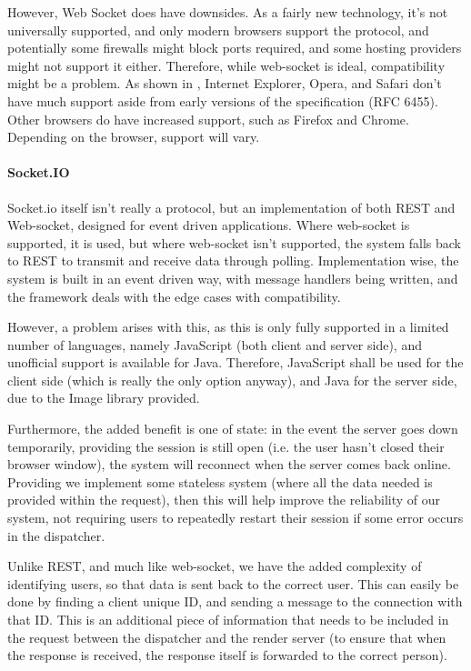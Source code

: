 \documentclass[10pt,a4paper]{article}
\begin{document}
However, Web Socket does have downsides. As a fairly new technology, it's not universally supported, and only modern browsers
support the protocol, and potentially some firewalls might block ports required, and some hosting providers might not support 
it either. Therefore, while web-socket is ideal, compatibility might be a problem. As shown in \cite{WebSocketDeveloper},
Internet Explorer, Opera, and Safari don't have much support aside from early versions of the specification (RFC 6455). Other browsers
do have increased support, such as Firefox and Chrome. Depending on the browser, support will vary.

\paragraph{Socket.IO}
Socket.io itself isn't really a protocol, but an implementation of both REST and Web-socket, designed for event driven
applications. Where web-socket is supported, it is used, but where web-socket isn't supported, the system falls back to
REST to transmit and receive data through polling. Implementation wise, the system is built in an event driven way,
with message handlers being written, and the framework deals with the edge cases with compatibility. \cite{SocketIOBook}

However, a problem arises with this, as this is only fully supported in a limited number of languages, namely JavaScript (both client
and server side), and unofficial support is available for Java. Therefore, JavaScript shall be used for the client side (which is really the only
option anyway), and Java for the server side, due to the Image library provided. 

Furthermore, the added benefit is one of state: in the event the server goes down temporarily, providing the session is still open (i.e. the user hasn't
closed their browser window), the system will reconnect when the server comes back online. Providing we implement some stateless system (where all the data
needed is provided within the request), then this will help improve the reliability of our system, not requiring users to repeatedly restart their session
if some error occurs in the dispatcher. 

Unlike REST, and much like web-socket, we have the added complexity of identifying users, so that data is sent back to the correct user. This can easily be done
by finding a client unique ID, and sending a message to the connection with that ID. This is an additional piece of information that needs to be included in the request
between the dispatcher and the render server (to ensure that when the response is received, the response itself is forwarded to the correct person).
\end{document}
